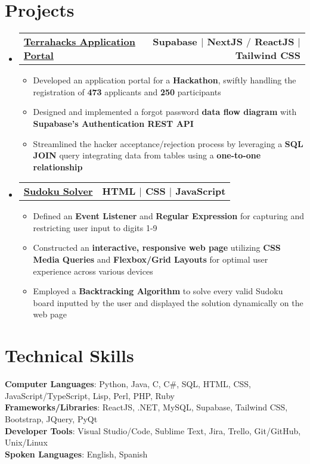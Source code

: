 \documentclass[letterpaper,11pt]{article}
\makeatletter
\newcommand{\resumeItem}[1]{
  \item\small{
    {#1 \vspace{-2pt}}
  }
}
\newcommand{\resumeProjectHeading}[2]{
    \item
    \begin{tabular*}{1.00\textwidth}{l@{\extracolsep{\fill}}r}
      \small#1 & #2 \\
    \end{tabular*}\vspace{-7pt}
    
}
\newcommand{\resumeSubHeadingListStart}{\begin{itemize}[leftmargin=0.0in, label={}]}
\newcommand{\resumeSubHeadingListEnd}{\end{itemize} \vspace{-18pt}}
\newcommand{\resumeItemListStart}{\begin{itemize}}
\newcommand{\resumeItemListEnd}{\end{itemize}\vspace{-4pt}}
\makeatother
\begin{document}
\section{Projects}
    \resumeSubHeadingListStart
      \vspace{-3pt}
      \resumeProjectHeading
        {
        \textbf{\href{https://portal.terrahacks.ca}{\color{blue}Terrahacks Application Portal}}
        }{\textbf{Supabase $|$ NextJS $/$ ReactJS $|$ Tailwind CSS}}
        \resumeItemListStart
            \resumeItem{Developed an application portal for a \textbf{Hackathon}, swiftly handling the registration of \textbf{473} applicants and \textbf{250} participants}
            \resumeItem{Designed and implemented a forgot password \textbf{data flow diagram} with \textbf{Supabase's  Authentication REST API}}
            \resumeItem{Streamlined the hacker acceptance/rejection process by leveraging a \textbf{SQL JOIN} query integrating data from tables using a \textbf{one-to-one relationship}}
          \resumeItemListEnd
      \vspace{-7pt}
      \resumeProjectHeading
          {
          \textbf{\href{https://nicholas489.github.io/Sudoku_Solver/}{\color{blue}Sudoku Solver}}
          }{\textbf{HTML $|$ CSS $|$ JavaScript}}
          \resumeItemListStart
            \resumeItem{Defined an \textbf{Event Listener} and \textbf{Regular Expression} for capturing and restricting user input to digits 1-9}
            \resumeItem{Constructed an \textbf{interactive, responsive web page} utilizing \textbf{CSS Media Queries} and \textbf{Flexbox/Grid Layouts} for optimal user experience across various devices}
            \resumeItem{Employed a \textbf{Backtracking Algorithm} to solve every valid Sudoku board inputted by the user and displayed the solution dynamically on the web page}
          \resumeItemListEnd
      \vspace{-3pt}
    \resumeSubHeadingListEnd
    
%
\section{Technical Skills}
 \begin{itemize}[leftmargin=0.0in, label={}]
    \small{\item{
     \textbf{Computer Languages}{: Python, Java, C, C\#, SQL, HTML, CSS, JavaScript/TypeScript, Lisp, Perl, PHP, Ruby} \\
     \textbf{Frameworks/Libraries}{: ReactJS, .NET, MySQL, Supabase, Tailwind CSS, Bootstrap, JQuery, PyQt} \\
     \textbf{Developer Tools}{: Visual Studio/Code, Sublime Text, Jira, Trello, Git/GitHub, Unix/Linux} \\
     \textbf{Spoken Languages}{: English, Spanish}
    }}
 \end{itemize}
\end{document}
